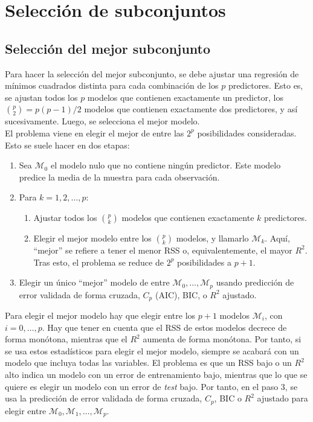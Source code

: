 \section{Selección de subconjuntos} \label{sec:4.1}

\subsection{Selección del mejor subconjunto}

Para hacer la selección del mejor subconjunto, se debe ajustar una regresión de mínimos cuadrados distinta para cada combinación de los $p$ predictores. Esto es, se ajustan todos los $p$ modelos que contienen exactamente un predictor, los $\binom{p}{2} = p(p-1)/2$ modelos que contienen exactamente dos predictores, y así sucesivamente. Luego, se selecciona el mejor modelo. \\

El problema viene en elegir el mejor de entre las $2^p$ posibilidades consideradas. Esto se suele hacer en dos etapas:
\begin{enumerate}
\item Sea $\mathcal{M}_0$ el modelo nulo que no contiene ningún predictor. Este modelo predice la media de la muestra para cada observación.
\item Para $k = 1, 2, \ldots, p$:
\begin{enumerate}
\item Ajustar todos los $\binom{p}{k}$ modelos que contienen exactamente $k$ predictores.
\item Elegir el mejor modelo entre los $\binom{p}{k}$ modelos, y llamarlo $\mathcal{M}_k$. Aquí, ``mejor'' se refiere a tener el menor RSS o, equivalentemente, el mayor $R^2$. Tras esto, el problema se reduce de $2^p$ posibilidades a $p+1$. 
\end{enumerate}
\item Elegir un único ``mejor'' modelo de entre $\mathcal{M}_0, \dots, \mathcal{M}_p$ usando predicción de error validada de forma cruzada, $C_p$ (AIC), BIC, o $R^2$ ajustado.
\end{enumerate}

Para elegir el mejor modelo hay que elegir entre los $p+1$ modelos $\mathcal{M}_i$, con $i = 0, \dots, p$. Hay que tener en cuenta que el RSS de estos modelos decrece de forma monótona, mientras que el $R^2$ aumenta de forma monótona. Por tanto, si se usa estos estadísticos para elegir el mejor modelo, siempre se acabará con un modelo que incluya todas las variables. El problema es que un RSS bajo o un $R^2$ alto indica un modelo con un error de entrenamiento bajo, mientras que lo que se quiere es elegir un modelo con un error de \textit{test} bajo. Por tanto, en el paso 3, se usa la predicción de error validada de forma cruzada, $C_p$, BIC o $R^2$ ajustado para elegir entre $\mathcal{M}_0, \mathcal{M}_1, \dots, \mathcal{M}_p$. 

